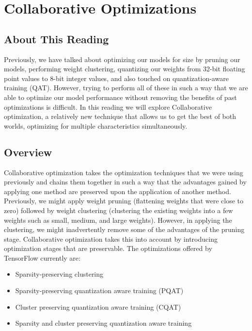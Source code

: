 {{{{{\section{Collaborative Optimizations}

    \subsection{About This Reading}
    
    Previously, we have talked about optimizing our models for size by pruning our models, performing weight clustering, quantizing our weights from 32-bit floating point values to 8-bit integer values, and also touched on quantization-aware training (QAT). However, trying to perform all of these in such a way that we are able to optimize our model performance without removing the benefits of past optimizations is difficult. In this reading we will explore Collaborative optimization, a relatively new technique that allows us to get the best of both worlds, optimizing for multiple characteristics  simultaneously.
    
    \subsection{Overview}
    
    Collaborative optimization takes the optimization techniques that we were using previously and chains them together in such a way that the advantages gained by applying one method are preserved upon the application of another method. Previously, we might apply weight pruning (flattening weights that were close to zero) followed by weight clustering (clustering the existing weights into a few weights such as small, medium, and large weights). However, in applying the clustering, we might inadvertently remove some of the advantages of the pruning stage. Collaborative optimization takes this into account by introducing optimization stages that are preservable. The optimizations offered by TensorFlow currently are:
    
    \begin{itemize}
      \item Sparsity-preserving clustering
      \item Sparsity-preserving quantization aware training (PQAT)
      \item Cluster preserving quantization aware training (CQAT)
      \item Sparsity and cluster preserving quantization aware training
    \end{itemize}
    
}}}}}
